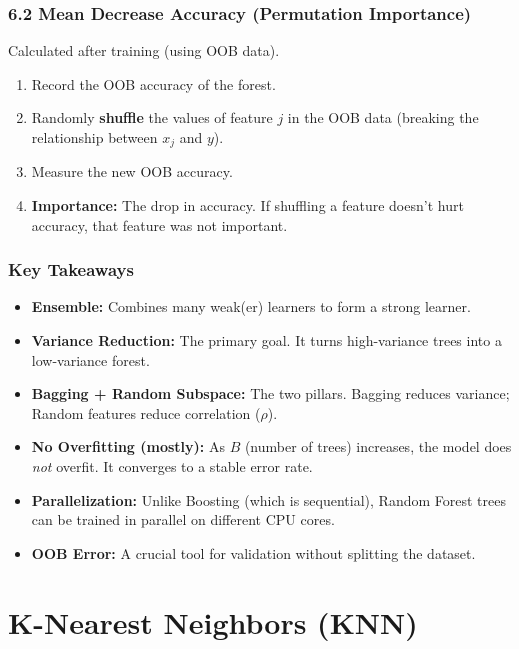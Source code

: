 \documentclass[
  italian,
  11pt,
]{article}
\begin{document}
\subsubsection{6.2 Mean Decrease Accuracy (Permutation
Importance)}\label{mean-decrease-accuracy-permutation-importance}

Calculated after training (using OOB data).

\begin{enumerate}
\def\labelenumi{\arabic{enumi}.}
\item
  Record the OOB accuracy of the forest.
\item
  Randomly \textbf{shuffle} the values of feature \(j\) in the OOB data
  (breaking the relationship between \(x_j\) and \(y\)).
\item
  Measure the new OOB accuracy.
\item
  \textbf{Importance:} The drop in accuracy. If shuffling a feature
  doesn't hurt accuracy, that feature was not important.
\end{enumerate}

\subsubsection{Key Takeaways}\label{key-takeaways-18}

\begin{itemize}
\item
  \textbf{Ensemble:} Combines many weak(er) learners to form a strong
  learner.
\item
  \textbf{Variance Reduction:} The primary goal. It turns high-variance
  trees into a low-variance forest.
\item
  \textbf{Bagging + Random Subspace:} The two pillars. Bagging reduces
  variance; Random features reduce correlation (\(\rho\)).
\item
  \textbf{No Overfitting (mostly):} As \(B\) (number of trees)
  increases, the model does \emph{not} overfit. It converges to a stable
  error rate.
\item
  \textbf{Parallelization:} Unlike Boosting (which is sequential),
  Random Forest trees can be trained in parallel on different CPU cores.
\item
  \textbf{OOB Error:} A crucial tool for validation without splitting
  the dataset.

  \newpage
\end{itemize}

\section{K-Nearest Neighbors (KNN)}\label{k-nearest-neighbors-knn}
\end{document}
